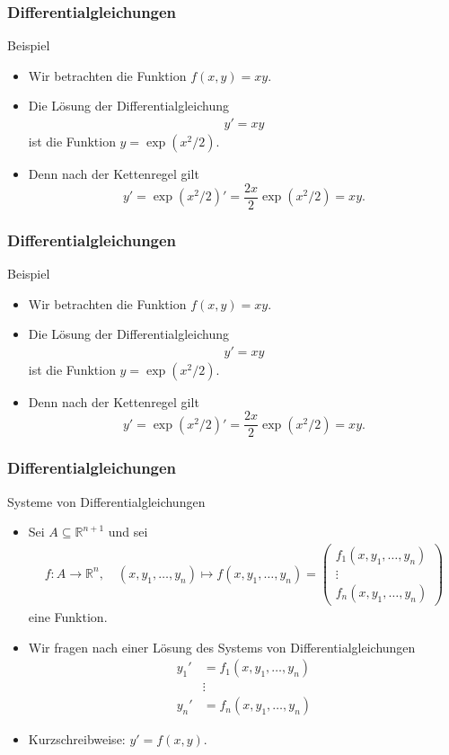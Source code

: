 \documentclass{beamer}
\newcommand\RR{\mathbb R}
\renewcommand{\oe}{\"o}
\newcommand{\mytitle}{Differentialgleichungen}
\begin{document}
\begin{frame}\frametitle{\mytitle}
	\begin{block}{Beispiel}
		\begin{itemize}
			\item Wir betrachten die Funktion $f(x,y)=xy$.
			\item Die L\oe sung der Differentialgleichung
				\begin{align*}
				y'=xy
				\end{align*}
				ist die Funktion $y=\exp(x^2/2)$.
			\item Denn nach der Kettenregel gilt
				$$y'=\exp(x^2/2)'=\frac{2x}{2}\exp(x^2/2)=xy.$$
		\end{itemize}
	\end{block}
\end{frame}

\begin{frame}\frametitle{\mytitle}
	\begin{block}{Beispiel}
		\begin{itemize}
			\item Wir betrachten die Funktion $f(x,y)=xy$.
			\item Die L\oe sung der Differentialgleichung
				\begin{align*}
				y'=xy
				\end{align*}
				ist die Funktion $y=\exp(x^2/2)$.
			\item Denn nach der Kettenregel gilt
				$$y'=\exp(x^2/2)'=\frac{2x}{2}\exp(x^2/2)=xy.$$
		\end{itemize}
	\end{block}
\end{frame}

\begin{frame}\frametitle{\mytitle}
	\begin{block}{Systeme von Differentialgleichungen}
		\begin{itemize}
			\item Sei $A\subseteq\RR^{n+1}$ und sei
				\begin{align*}
					f:A\to\RR^n,\quad (x,y_1,\ldots,y_n)\mapsto f(x,y_1,\ldots,y_n)=\begin{pmatrix}f_1(x,y_1,\ldots,y_n)\\\vdots\\f_n(x,y_1,\ldots,y_n)
					\end{pmatrix}
				\end{align*}
				eine Funktion.
			\item Wir fragen nach einer L\oe sung des Systems von Differentialgleichungen
				\begin{align*}
					y_1'&=f_1(x,y_1,\ldots,y_n)\\&\vdots\\y_n'&=f_n(x,y_1,\ldots,y_n)
				\end{align*}
			\item \alert{Kurzschreibweise:} $y'=f(x,y)$.
		\end{itemize}
	\end{block}
\end{frame}
\end{document}
